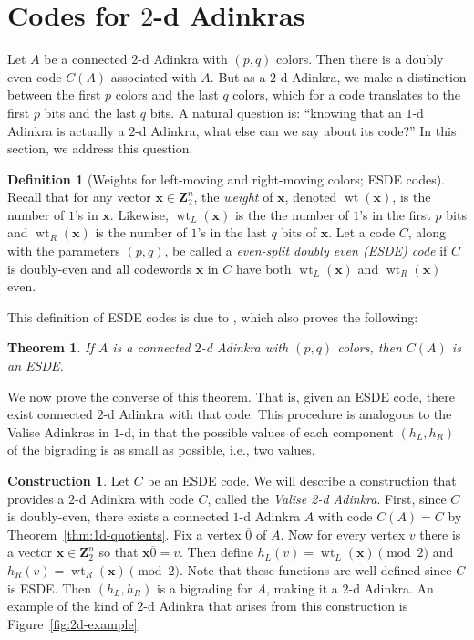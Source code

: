 \documentclass[12pt,twoside,singlespace]{article}
\numberwithin{equation}{section}
\newtheorem{thm}[equation]{Theorem}
\theoremstyle{definition}
\newtheorem{definition}[equation]{Definition}
\newtheorem{construction}[equation]{Construction}
\newcommand{\ZZ}{\mathbf{Z}}
\newcommand{\on}{\operatorname}
\newcommand{\wt}{\on{wt}}
\renewcommand{\vec}[1]{\mathbf{#1}}
\begin{document}
\section{Codes for $2$-d Adinkras}
\label{sec:code2d}
Let $A$ be a connected $2$-d Adinkra with $(p,q)$ colors.  Then there is a doubly even code $C(A)$ associated with $A$.  But as a $2$-d Adinkra, we make a distinction between the first $p$ colors and the last $q$ colors, which for a code translates to the first $p$ bits and the last $q$ bits. A natural question is: ``knowing that an $1$-d Adinkra is actually a $2$-d Adinkra, what else can we say about its code?'' In this section, we address this question.

\begin{definition}[Weights for left-moving and right-moving colors; ESDE codes]
Recall that for any vector $\vec{x}\in\ZZ_2^n$, the \emph{weight} of $\vec{x}$, denoted $\wt(\vec{x})$, is the number of $1$'s in $\vec{x}$.  Likewise, $\wt_L(\vec{x})$ is the the number of $1$'s in the first $p$ bits and $\wt_R(\vec{x})$ is the number of $1$'s in the last $q$ bits of $\vec{x}$. Let a code $C$, along with the parameters $(p,q)$, be called a \emph{even-split doubly even (ESDE) code} if $C$ is doubly-even and all codewords $\vec{x}$ in $C$ have both $\wt_L(\vec{x})$ and $\wt_R(\vec{x})$ even.
\end{definition}

This definition of ESDE codes is due to \cite{hubsch:weaving}, which also proves the following: 
\begin{thm}
\label{thm:esde}
If $A$ is a connected $2$-d Adinkra with $(p,q)$ colors, then $C(A)$ is an ESDE.
\end{thm}

We now prove the converse of this theorem.  That is, given an ESDE code, there exist connected $2$-d Adinkra with that code.  This procedure is analogous to the Valise Adinkras in $1$-d,\cite{d2l:first,d2l:graph-theoretic} in that the possible values of each component $(h_L,h_R)$ of the bigrading is as small as possible, i.e., two values.

\begin{construction}
\label{cons:valise}
Let $C$ be an ESDE code.  We will describe a construction that provides a $2$-d Adinkra with code $C$, called the {\em Valise 2-d Adinkra}. First, since $C$ is doubly-even, there exists a connected $1$-d Adinkra $A$ with code $C(A) = C$ by Theorem~\ref{thm:1d-quotients}. Fix a vertex $\overline{0}$ of $A$.  Now for every vertex $v$ there is a vector $\vec{x}\in\ZZ_2^n$ so that $\vec{x}\overline{0}=v$.  Then define $h_L(v)=\wt_L(\vec{x})\pmod{2}$ and $h_R(v)=\wt_R(\vec{x})\pmod{2}$.  Note that these functions are well-defined since $C$ is ESDE.  Then $(h_L, h_R)$ is a bigrading for $A$, making it a $2$-d Adinkra.  An example of the kind of $2$-d Adinkra that arises from this construction is Figure~\ref{fig:2d-example}.
\end{construction}
\end{document}
